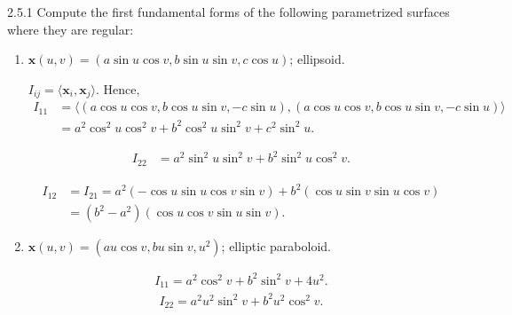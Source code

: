 \documentclass[11pt]{article}
\begin{document}
\begin{problem}{2.5.1}
	Compute the first fundamental forms of the following parametrized surfaces where they are regular:
	\begin{enumerate}[label=(\alph*)]
		\item \( \mathbf{x}(u,v) = (a \sin u \cos v, b \sin u \sin v, c \cos u) \); ellipsoid.
		      \begin{answer}
			      \( I_{ij} = \langle \mathbf{x}_i, \mathbf{x}_j  \rangle \).
			      Hence,
			      \begin{equation}
				      \label{eq:6}
				      \begin{aligned}
					      I_{11} & = \langle (a\cos u \cos v, b \cos u \sin v, -c\sin u), (a\cos u \cos v, b \cos u \sin v, -c\sin u) \rangle \\
					             & = a^2 \cos^2 u \cos^2 v + b^2 \cos^2 u \sin^2 v + c^2 \sin^2 u.
				      \end{aligned}
			      \end{equation}

			      \begin{equation}
				      \label{eq:7}
				      \begin{aligned}
					      I_{22} & = a^2 \sin^2 u \sin^2 v + b^2 \sin^2 u \cos^2 v.
				      \end{aligned}
			      \end{equation}

			      \begin{equation}
				      \label{eq:8}
				      \begin{aligned}
					      I_{12} & = I_{21} = a^2(-\cos u \sin u \cos v \sin v) + b^2(\cos u \sin v \sin u \cos v) \\
					             & = (b^2 - a^2)(\cos u \cos v \sin u \sin v).
				      \end{aligned}
			      \end{equation}
		      \end{answer}
		\item \( \mathbf{x}(u,v) = (au \cos v, bu\sin v, u^2) \); elliptic paraboloid.
		      \begin{answer}
			      \begin{equation}
				      \label{eq:9}
				      \begin{aligned}
					      I_{11} = a^2 \cos^2 v + b^2 \sin^2 v + 4 u^2.
				      \end{aligned}
			      \end{equation}
			      \begin{equation}
				      \label{eq:10}
				      \begin{aligned}
					      I_{22} = a^2 u^2 \sin^2 v + b^2 u^2 \cos^2 v.
				      \end{aligned}
			      \end{equation}


\end{answer}
\end{enumerate}
\end{problem}
\end{document}
